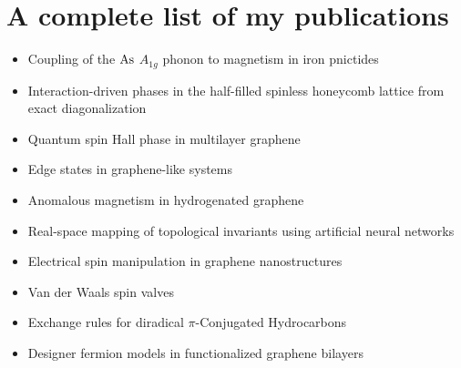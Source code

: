 \chapter{A complete list of my publications}

\begin{itemize}
   \item Coupling of the $\ce{As}$ $A_{1g}$ phonon to magnetism in iron pnictides\cite{Garcia-Martinez2013}

   \item Interaction-driven phases in the half-filled spinless honeycomb lattice from exact diagonalization\cite{Garcia-Martinez2013a}

   \item Quantum spin Hall phase in multilayer graphene\cite{Garcia-Martinez2015}
   \item Edge states in graphene-like systems\cite{Lado2015}

   \item Anomalous magnetism in hydrogenated graphene\cite{Garcia-Martinez2017}

   \item Real-space mapping of topological invariants using artificial neural networks\cite{Carvalho2018}

   \item Electrical spin manipulation in graphene nanostructures\cite{Ortiz2018}

   \item Van der Waals spin valves\cite{Cardoso2018}

   \item Exchange rules for diradical $\pi$-Conjugated Hydrocarbons\cite{Ortiz2019}

   \item Designer fermion models in functionalized graphene bilayers\cite{Garcia-Martinez2019}
\end{itemize}
